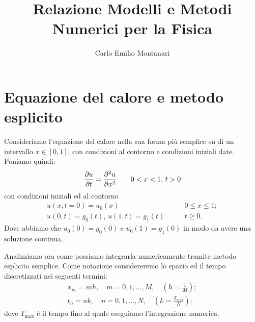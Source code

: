 \documentclass[10pt,a4paper]{article}
\title{Relazione Modelli e Metodi Numerici per la Fisica}
\author{Carlo Emilio Montanari}
\begin{document}
\maketitle

\tableofcontents

\newpage


\section{Equazione del calore e metodo esplicito}

Consideriamo l'equazione del calore nella sua forma più semplice su di un intervallo $x \in [0,1]$, con condizioni al contorno e condizioni iniziali date. Poniamo quindi:
\begin{equation}
	\pdv{u}{t} = \pdv[2]{u}{x} \quad\quad 0<x<1,\,t>0
	\label{eq:equazione_calore}
\end{equation}
con condizioni iniziali ed al contorno
\begin{align}
	u(x,t=0)=u_0(x) &\quad\quad 0\leq x\leq 1;\\
	u(0,t)=g_0(t),\, u(1,t)=g_1(t) &\quad\quad t\geq 0.
\end{align}
Dove abbiamo che $u_0(0) = g_0(0)$ e $u_0(1) = g_1(0)$ in modo da avere una soluzione continua.

Analizziamo ora come possiamo integrarla numericamente tramite metodo esplicito semplice. Come notazione considereremo lo spazio ed il tempo discretizzati nei seguenti termini:
\begin{align}
	x_m = mh, \quad m = 0,1,\dots,M, \quad (h=\frac{1}{M});\\
	t_n = nk, \quad n = 0,1,\dots,N, \quad (k=\frac{T_{\text{max}}}{N});
\end{align}
dove $T_{\text{max}}$ è il tempo fino al quale eseguiamo l'integrazione numerica.
\end{document}
